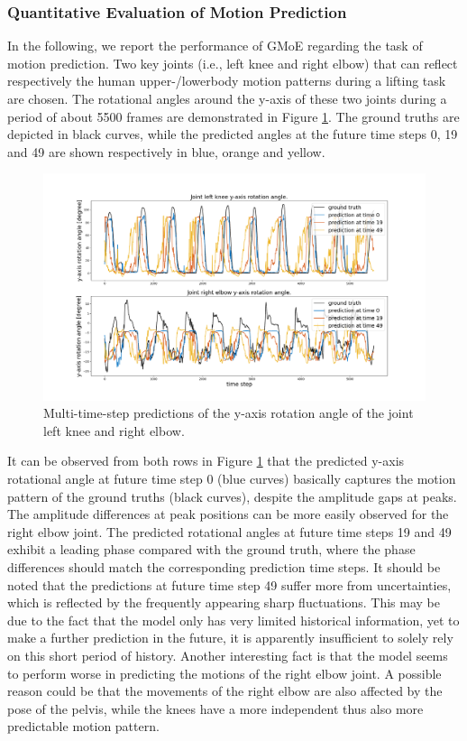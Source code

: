 \subsubsection{Quantitative Evaluation of Motion Prediction}
\label{sec: analysis motion prediction}
In the following, we report the performance of GMoE regarding the task of motion prediction. Two key joints (i.e., left knee and right elbow) that can reflect respectively the human upper-/lowerbody motion patterns during a lifting task are chosen. The rotational angles around the y-axis of these two joints during a period of about 5500 frames are demonstrated in Figure \ref{fig:motion_predictions}. The ground truths are depicted in black curves, while the predicted angles at the future time steps 0, 19 and 49 are shown respectively in blue, orange and yellow.
\begin{figure}[t]
   \centering
   \includegraphics[width=1.1\columnwidth]{figures/motion_predictions02.png}
   \caption{Multi-time-step predictions of the y-axis rotation angle of the joint left knee and right elbow.}
   \label{fig:motion_predictions}
\end{figure}

It can be observed from both rows in Figure \ref{fig:motion_predictions} that the predicted y-axis rotational angle at future time step 0 (blue curves) basically captures the motion pattern of the ground truths (black curves), despite the amplitude gaps at peaks. The amplitude differences at peak positions can be more easily observed for the right elbow joint. The predicted rotational angles at future time steps 19 and 49 exhibit a leading phase compared with the ground truth, where the phase differences should match the corresponding prediction time steps. It should be noted that the predictions at future time step 49 suffer more from uncertainties, which is reflected by the frequently appearing sharp fluctuations. This may be due to the fact that the model only has very limited historical information, yet to make a further prediction in the future, it is apparently insufficient to solely rely on this short period of history. Another interesting fact is that the model seems to perform worse in predicting the motions of the right elbow joint. A possible reason could be that the movements of the right elbow are also affected by the pose of the pelvis, while the knees have a more independent thus also more predictable motion pattern.


